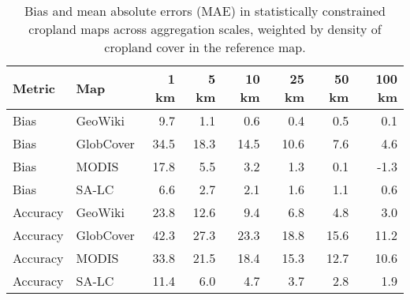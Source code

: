\begin{longtable}{llrrrrrr}
\caption{Bias and mean absolute errors (MAE) in statistically constrained cropland maps across aggregation scales, weighted by density of cropland cover in the reference map. } \\ 
  \hline
Metric & Map & 1 km & 5 km & 10 km & 25 km & 50 km & 100 km \\ 
  \hline
Bias & GeoWiki & 9.7 & 1.1 & 0.6 & 0.4 & 0.5 & 0.1 \\ 
  Bias & GlobCover & 34.5 & 18.3 & 14.5 & 10.6 & 7.6 & 4.6 \\ 
  Bias & MODIS & 17.8 & 5.5 & 3.2 & 1.3 & 0.1 & -1.3 \\ 
  Bias & SA-LC & 6.6 & 2.7 & 2.1 & 1.6 & 1.1 & 0.6 \\ 
  Accuracy & GeoWiki & 23.8 & 12.6 & 9.4 & 6.8 & 4.8 & 3.0 \\ 
  Accuracy & GlobCover & 42.3 & 27.3 & 23.3 & 18.8 & 15.6 & 11.2 \\ 
  Accuracy & MODIS & 33.8 & 21.5 & 18.4 & 15.3 & 12.7 & 10.6 \\ 
  Accuracy & SA-LC & 11.4 & 6.0 & 4.7 & 3.7 & 2.8 & 1.9 \\ 
   \hline
\hline
\end{longtable}
